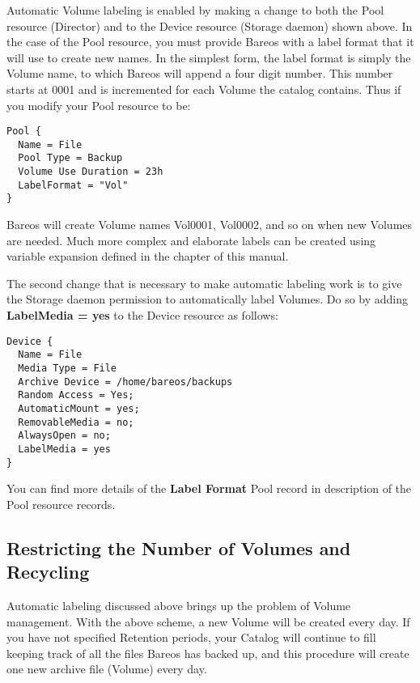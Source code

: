 Automatic Volume labeling is enabled by making a change to both the Pool
resource (Director) and to the Device resource (Storage daemon) shown above.
In the case of the Pool resource, you must provide Bareos with a label format
that it will use to create new names. In the simplest form, the label format
is simply the Volume name, to which Bareos will append a four digit number.
This number starts at 0001 and is incremented for each Volume the catalog
contains. Thus if you modify your Pool resource to be:

\footnotesize
\begin{verbatim}
Pool {
  Name = File
  Pool Type = Backup
  Volume Use Duration = 23h
  LabelFormat = "Vol"
}
\end{verbatim}
\normalsize

Bareos will create Volume names Vol0001, Vol0002, and so on when new Volumes
are needed. Much more complex and elaborate labels can be created using
variable expansion defined in the
 chapter of this manual.

The second change that is necessary to make automatic labeling work is to give
the Storage daemon permission to automatically label Volumes. Do so by adding
{\bf LabelMedia = yes} to the Device resource as follows:

\footnotesize
\begin{verbatim}
Device {
  Name = File
  Media Type = File
  Archive Device = /home/bareos/backups
  Random Access = Yes;
  AutomaticMount = yes;
  RemovableMedia = no;
  AlwaysOpen = no;
  LabelMedia = yes
}
\end{verbatim}
\normalsize

You can find more details of the {\bf Label Format} Pool record in
 description of the Pool resource
records.

\label{Recycling1}
\subsection{Restricting the Number of Volumes and Recycling}

Automatic labeling discussed above brings up the problem of Volume management.
With the above scheme, a new Volume will be created every day. If you have not
specified Retention periods, your Catalog will continue to fill keeping track
of all the files Bareos has backed up, and this procedure will create one new
archive file (Volume) every day.

